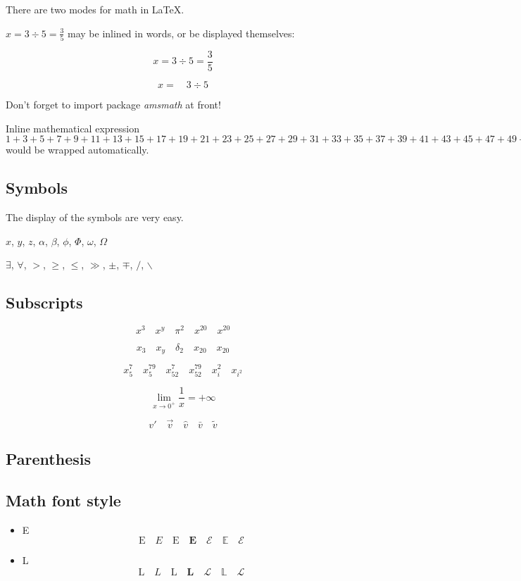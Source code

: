 \documentclass{article}
\begin{document}
There are two modes for math in \LaTeX .

$x = 3\div 5 = \frac{3}{5}$ may be inlined in words, or be displayed themselves: 

$$
x = 3\div 5 = \frac{3}{5}
$$

\[
x = \quad 3\div 5
\]

Don't forget to import package {\it amsmath} at front!

Inline mathematical expression  $1+3+5+7+9+11+13+15+17+19+21+23+25+27+29+31+33+35+37+39+41+43+45+47+49+51+53+55+57+59+61+63+64+67+69$ would be wrapped automatically.

\subsection{Symbols}

The display of the symbols are very easy.

$x$, $y$, $z$, $\alpha$, $\beta$, $\phi$, $\Phi$, $\omega$, $\Omega$

$\exists$, $\forall$, $>$, $\geq$, $\leq$, $\gg$, $\pm$, $\mp$, $/$, $\backslash$

\subsection{Subscripts}

$$
x^3 \quad x^y \quad \pi^2 \quad x^20 \quad x^{20}
$$

$$
x_3 \quad x_y \quad \delta_2 \quad x_20 \quad x_{20}
$$

\[
x_5^7 \quad x_5^{79} \quad x_{52}^7 \quad x_{52}^{79} \quad x_i^2 \quad x_{i^2}
\]

$$
\lim_{x\to 0^+}\frac{1}{x} = +\infty
$$

$$
v' \quad \vec{v} \quad \hat{v} \quad \bar{v} \quad \tilde{v}
$$

\subsection{Parenthesis}

\subsection{Math font style}

\begin{itemize}
    \item E 
    $$
    \text{E} \quad E \quad \mathrm{E} \quad \mathbf{E} \quad \mathcal{E} \quad \mathbb{E} \quad \mathscr{E}
    $$
    \item L
    $$
    \text{L} \quad L \quad \mathrm{L} \quad \mathbf{L} \quad \mathcal{L} \quad \mathbb{L} \quad \mathscr{L}
    $$
\end{itemize}
\end{document}
